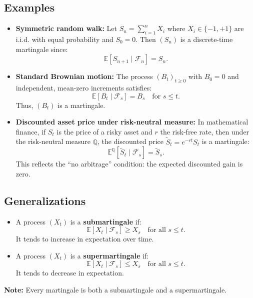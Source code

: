 \subsection{Examples}
\begin{itemize}
  \item \textbf{Symmetric random walk:} Let \( S_n = \sum_{i=1}^n X_i \) where \( X_i \in \{-1, +1\} \) are i.i.d. with equal probability and \( S_0 = 0 \). Then \( (S_n) \) is a discrete-time martingale since:
  \[
  \mathbb{E}[S_{n+1} \mid \mathcal{F}_n] = S_n.
  \]

  \item \textbf{Standard Brownian motion:} The process \( (B_t)_{t \ge 0} \) with \( B_0 = 0 \) and independent, mean-zero increments satisfies:
  \[
  \mathbb{E}[B_t \mid \mathcal{F}_s] = B_s \quad \text{for } s \le t.
  \]
  Thus, \( (B_t) \) is a martingale.

  \item \textbf{Discounted asset price under risk-neutral measure:} In mathematical finance, if \( S_t \) is the price of a risky asset and \( r \) the risk-free rate, then under the risk-neutral measure \( \mathbb{Q} \), the discounted price \( \tilde{S}_t = e^{-rt} S_t \) is a martingale:
  \[
  \mathbb{E}^{\mathbb{Q}}[\tilde{S}_t \mid \mathcal{F}_s] = \tilde{S}_s.
  \]
  This reflects the ``no arbitrage'' condition: the expected discounted gain is zero.
\end{itemize}

\subsection*{Generalizations}
\begin{itemize}
  \item A process \( (X_t) \) is a \textbf{submartingale} if:
  \[
  \mathbb{E}[X_t \mid \mathcal{F}_s] \ge X_s \quad \text{for all } s \le t.
  \]
  It tends to increase in expectation over time.

  \item A process \( (X_t) \) is a \textbf{supermartingale} if:
  \[
  \mathbb{E}[X_t \mid \mathcal{F}_s] \le X_s \quad \text{for all } s \le t.
  \]
  It tends to decrease in expectation.
\end{itemize}

\textbf{Note:} Every martingale is both a submartingale and a supermartingale.